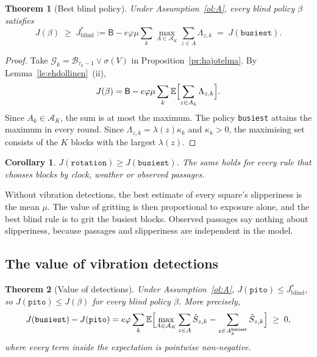 \documentclass[11pt,a4paper]{article}
\theoremstyle{plain}
\newtheorem{lause}{Theorem}
\newtheorem{seuraus}{Corollary}
\theoremstyle{definition}
\theoremstyle{remark}
\newcommand{\E}{\mathbb{E}}
\newcommand{\cB}{\mathcal{B}}
\newcommand{\cG}{\mathcal{G}}
\newcommand{\cA}{\mathcal{A}}
\newcommand{\1}{\mathbf{1}}
\newcommand{\pol}[1]{\texttt{#1}}
\begin{document}
\begin{lause}[Best blind policy]\label{la:sokea}
Under Assumption~\ref{ol:A}, every blind policy $\beta$ satisfies
\[
  J(\beta) \;\ge\; J^\ast_{\mathrm{blind}} := \mathsf{B} - e\varphi\mu \sum_{k} \max_{A \in \cA_K} \sum_{z \in A} \Lambda_{z,k}
  \;=\; J(\pol{busiest}).
\]
\end{lause}

\begin{proof}
Take $\cG_k = \cB_{\tau_k - 1} \vee \sigma(V)$ in Proposition~\ref{pr:hajotelma}.
By Lemma~\ref{le:ehdollinen}~(ii),
\[
  J(\beta) = \mathsf{B} - e\varphi\mu \sum_k \E\Bigl[\sum_{z \in A_k} \Lambda_{z,k}\Bigr].
\]
Since $A_k \in \cA_K$, the sum is at most the maximum. The policy \pol{busiest}
attains the maximum in every round. Since $\Lambda_{z,k} = \lambda(z)\kappa_k$ and
$\kappa_k > 0$, the maximising set consists of the $K$ blocks with the largest
$\lambda(z)$.
\end{proof}

\begin{seuraus}
$J(\pol{rotation}) \ge J(\pol{busiest})$. The same holds for every rule that
chooses blocks by clock, weather or observed passages.
\end{seuraus}

\begin{intuitio}
Without vibration detections, the best estimate of every square's slipperiness
is the mean $\mu$. The value of gritting is then proportional to exposure alone,
and the best blind rule is to grit the busiest blocks. Observed passages say
nothing about slipperiness, because passages and slipperiness are independent in
the model.
\end{intuitio}

\subsection{The value of vibration detections}

\begin{lause}[Value of detections]\label{la:arvo}
Under Assumption~\ref{ol:A}, $J(\pol{pito}) \le J^\ast_{\mathrm{blind}}$, so
$J(\pol{pito}) \le J(\beta)$ for every blind policy $\beta$. More precisely,
\begin{equation}\label{eq:arvo}
  J(\pol{busiest}) - J(\pol{pito}) = e\varphi \sum_{k} \E\Bigl[\max_{A \in \cA_K} \sum_{z \in A} \hat S_{z,k}
  - \sum_{z \in A^{\pol{busiest}}_k} \hat S_{z,k}\Bigr] \;\ge\; 0,
\end{equation}
where every term inside the expectation is pointwise non-negative.
\end{lause}
\end{document}
